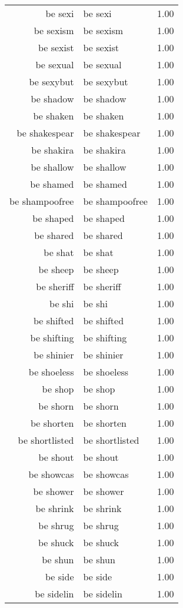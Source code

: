 \begin{table}[ht]
\begin{tabular}{rlr}
  be sexi & be sexi & 1.00 \\ 
  be sexism & be sexism & 1.00 \\ 
  be sexist & be sexist & 1.00 \\ 
  be sexual & be sexual & 1.00 \\ 
  be sexybut & be sexybut & 1.00 \\ 
  be shadow & be shadow & 1.00 \\ 
  be shaken & be shaken & 1.00 \\ 
  be shakespear & be shakespear & 1.00 \\ 
  be shakira & be shakira & 1.00 \\ 
  be shallow & be shallow & 1.00 \\ 
  be shamed & be shamed & 1.00 \\ 
  be shampoofree & be shampoofree & 1.00 \\ 
  be shaped & be shaped & 1.00 \\ 
  be shared & be shared & 1.00 \\ 
  be shat & be shat & 1.00 \\ 
  be sheep & be sheep & 1.00 \\ 
  be sheriff & be sheriff & 1.00 \\ 
  be shi & be shi & 1.00 \\ 
  be shifted & be shifted & 1.00 \\ 
  be shifting & be shifting & 1.00 \\ 
  be shinier & be shinier & 1.00 \\ 
  be shoeless & be shoeless & 1.00 \\ 
  be shop & be shop & 1.00 \\ 
  be shorn & be shorn & 1.00 \\ 
  be shorten & be shorten & 1.00 \\ 
  be shortlisted & be shortlisted & 1.00 \\ 
  be shout & be shout & 1.00 \\ 
  be showcas & be showcas & 1.00 \\ 
  be shower & be shower & 1.00 \\ 
  be shrink & be shrink & 1.00 \\ 
  be shrug & be shrug & 1.00 \\ 
  be shuck & be shuck & 1.00 \\ 
  be shun & be shun & 1.00 \\ 
  be side & be side & 1.00 \\ 
  be sidelin & be sidelin & 1.00 \\ 

\end{tabular}
\end{table}
